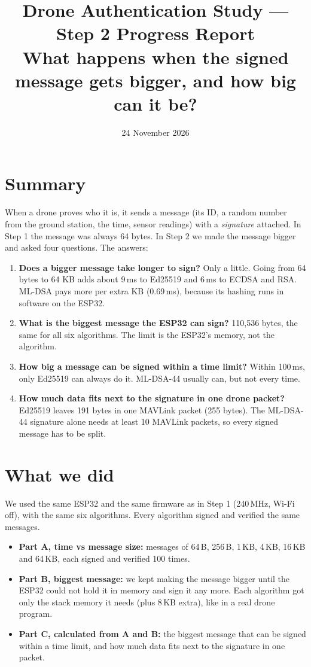 \documentclass[10pt,a4paper]{article}
\title{Drone Authentication Study --- Step 2 Progress Report\\[3pt]
\large What happens when the signed message gets bigger, and how big can it be?}
\author{}
\date{24 November 2026}
\begin{document}
\maketitle

\section*{Summary}

When a drone proves who it is, it sends a message (its ID, a random number from the ground
station, the time, sensor readings) with a \emph{signature} attached. In Step 1 the message was
always 64 bytes. In Step 2 we made the message bigger and asked four questions. The answers:

\begin{enumerate}[nosep]
  \item \textbf{Does a bigger message take longer to sign?} Only a little. Going from 64 bytes
        to 64 KB adds about 9\,ms to Ed25519 and 6\,ms to ECDSA and RSA. ML-DSA pays more per
        extra KB (0.69\,ms), because its hashing runs in software on the ESP32.
  \item \textbf{What is the biggest message the ESP32 can sign?} 110,536 bytes, the same for all
        six algorithms. The limit is the ESP32's memory, not the algorithm.
  \item \textbf{How big a message can be signed within a time limit?} Within 100\,ms, only
        Ed25519 can always do it. ML-DSA-44 usually can, but not every time.
  \item \textbf{How much data fits next to the signature in one drone packet?} Ed25519 leaves
        191 bytes in one MAVLink packet (255 bytes). The ML-DSA-44 signature alone needs at
        least 10 MAVLink packets, so every signed message has to be split.
\end{enumerate}

\section{What we did}

We used the same ESP32 and the same firmware as in Step 1 (240\,MHz, Wi-Fi off), with the same
six algorithms. Every algorithm signed and verified the same messages.

\begin{itemize}[nosep]
  \item \textbf{Part A, time vs message size:} messages of 64\,B, 256\,B, 1\,KB, 4\,KB, 16\,KB and
        64\,KB, each signed and verified 100 times.
  \item \textbf{Part B, biggest message:} we kept making the message bigger until the ESP32 could
        not hold it in memory and sign it any more. Each algorithm got only the stack memory it
        needs (plus 8\,KB extra), like in a real drone program.
  \item \textbf{Part C, calculated from A and B:} the biggest message that can be signed within a
        time limit, and how much data fits next to the signature in one packet.
\end{itemize}
\end{document}
